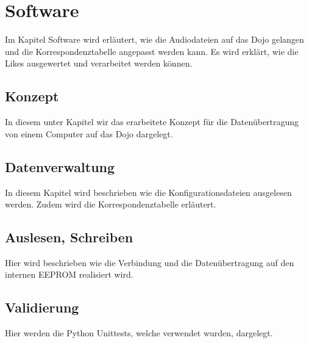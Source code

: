 \chapter{Software}
\thispagestyle{fancy}  \setcounter{page}{1} \cfoot{\thepage} \renewcommand{\footrulewidth}{0.4pt} 
Im Kapitel Software wird erläutert, wie die Audiodateien auf das Dojo gelangen und die Korrespondenztabelle angepasst werden kann. Es wird erklärt, wie die Likes ausgewertet und verarbeitet werden können.
\section{Konzept}
In diesem unter Kapitel wir das erarbeitete Konzept für die Datenübertragung von einem Computer auf das Dojo dargelegt.

\section{Datenverwaltung}
In diesem Kapitel wird beschrieben wie die Konfigurationsdateien ausgelesen werden. Zudem wird die Korrespondenztabelle erläutert. 

\section{Auslesen, Schreiben}
Hier wird beschrieben wie die Verbindung und die Datenübertragung auf den internen EEPROM realisiert wird.
\section{Validierung}
Hier werden die Python Unittests, welche verwendet wurden, dargelegt.

